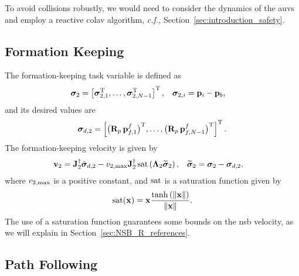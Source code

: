 To avoid collisions robustly, we would need to consider the dynamics of the \glspl{auv} and employ a reactive \gls{colav} algorithm, \emph{c.f.,} Section~\ref{sec:introduction_safety}.

\subsection{Formation Keeping}
\label{sec:NSB_R_formation}
The formation-keeping task variable is defined as
\begin{align}
    \bm{\sigma}_2 &= \left[\bm{\sigma}_{2,1}^{\mathrm{T}}, \ldots, \bm{\sigma}_{2,N-1}^{\mathrm{T}}\right]^{\mathrm{T}}, \label{eq:NSB_R_sigma_2} &
    \bm{\sigma}_{2,i} &= \mathbf{p}_i - \mathbf{p}_b,
\end{align}
and its desired values are 
\begin{equation}
    \bm{\sigma}_{d,2} = \left[\bigl(\mathbf{R}_p\,\mathbf{p}_{f,1}^f\bigr)^{\mathrm{T}}, \ldots, \bigl(\mathbf{R}_p\,\mathbf{p}_{f,N-1}^f\bigr)^{\mathrm{T}}\right]^{\mathrm{T}}  .
    \label{eq:NSB_R_sigma_d_2}
\end{equation}
The formation-keeping velocity is given by 
\begin{align}
    \mathbf{v}_2 &= \mathbf{J}_2^{\dagger}\dot{\bm{\sigma}}_{d,2} - v_{2, \max}\mathbf{J}_2^{\dagger}\,{\rm sat}\left(\bm{\Lambda}_2\widetilde{\bm{\sigma}}_2\right), &
    \widetilde{\bm{\sigma}}_2 &= \bm{\sigma}_2 - \bm{\sigma}_{d, 2},
    \label{eq:NSB_R_v_form}
\end{align}
where $v_{2, \max}$ is a positive constant, and $\rm sat$ is a saturation function given by 
\begin{equation}
    {\rm sat}(\mathbf{x}) = \mathbf{x} \frac{{\rm tanh}\left(\left\|\mathbf{x}\right\|\right)}{\left\|\mathbf{x}\right\|}.
\end{equation}
The use of a saturation function guarantees some bounds on the \gls{nsb} velocity, as we will explain in Section~\ref{sec:NSB_R_references}.

\subsection{Path Following}
\label{sec:NSB_R_LOS}

